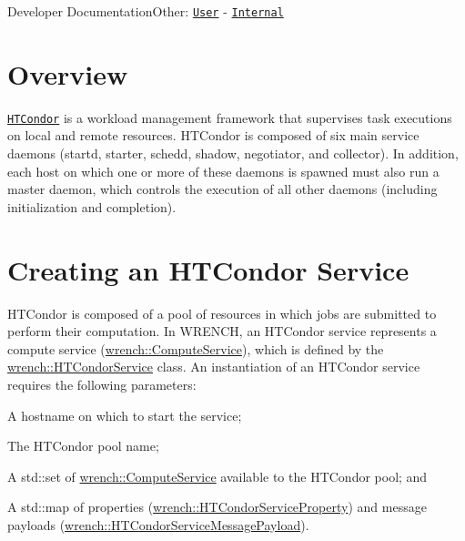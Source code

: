 Developer DocumentationOther\+: \href{../user/guide-htcondor.html}{\tt User} -\/ \href{../internal/guide-htcondor.html}{\tt Internal}\hypertarget{guide-htcondor_guide-htcondor-overview}{}\section{Overview}\label{guide-htcondor_guide-htcondor-overview}
\href{http://htcondor.org}{\tt H\+T\+Condor} is a workload management framework that supervises task executions on local and remote resources. H\+T\+Condor is composed of six main service daemons ({\ttfamily startd}, {\ttfamily starter}, {\ttfamily schedd}, {\ttfamily shadow}, {\ttfamily negotiator}, and {\ttfamily collector}). In addition, each host on which one or more of these daemons is spawned must also run a {\ttfamily master} daemon, which controls the execution of all other daemons (including initialization and completion).\hypertarget{guide-htcondor_guide-htcondor-creating}{}\section{Creating an H\+T\+Condor Service}\label{guide-htcondor_guide-htcondor-creating}
H\+T\+Condor is composed of a pool of resources in which jobs are submitted to perform their computation. In W\+R\+E\+N\+CH, an H\+T\+Condor service represents a compute service ({\ttfamily \hyperlink{classwrench_1_1_compute_service}{wrench\+::\+Compute\+Service}}), which is defined by the {\ttfamily \hyperlink{classwrench_1_1_h_t_condor_service}{wrench\+::\+H\+T\+Condor\+Service}} class. An instantiation of an H\+T\+Condor service requires the following parameters\+:


\begin{DoxyItemize}
\item A hostname on which to start the service;
\item The H\+T\+Condor pool name;
\item A {\ttfamily std\+::set} of {\ttfamily \hyperlink{classwrench_1_1_compute_service}{wrench\+::\+Compute\+Service}} available to the H\+T\+Condor pool; and
\item A {\ttfamily std\+::map} of properties ({\ttfamily \hyperlink{classwrench_1_1_h_t_condor_service_property}{wrench\+::\+H\+T\+Condor\+Service\+Property}}) and message payloads ({\ttfamily \hyperlink{classwrench_1_1_h_t_condor_service_message_payload}{wrench\+::\+H\+T\+Condor\+Service\+Message\+Payload}}).
\end{DoxyItemize}

